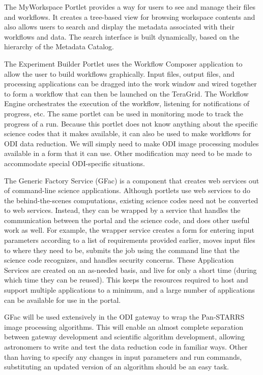 \documentclass[10pt,conference]{IEEEtran}
\begin{document}
The MyWorkspace Portlet provides a way for users to see and manage their files and workflows. It creates a tree-based view for browsing workspace contents and also allows users to search and display the metadata associated with their workflows and data. The search interface is built dynamically, based on the hierarchy of the Metadata Catalog. 

The Experiment Builder Portlet uses the Workflow Composer application to allow the user to build workflows graphically. Input files, output files, and processing applications can be dragged into the work window and wired together to form a workflow that can then be launched on the TeraGrid. The Workflow Engine orchestrates the execution of the workflow, listening for notifications of progress, etc. The same portlet can be used in monitoring mode to track the progress of a run. Because this portlet does not know anything about the specific science codes that it makes available, it can also be used to make workflows for ODI data reduction. We will simply need to make  ODI image processing modules available in a form that it can use. Other modification may need to be made to accommodate special ODI-specific situations.
 
The Generic Factory Service (GFac) is a component that creates web services out of command-line science applications. Although portlets use web services to do the behind-the-scenes computations, existing science codes need not be converted to web services. Instead, they can be wrapped by a service that handles the communication between the portal and the science code, and does other useful work as well. For example, the wrapper service creates a form for entering input parameters according to a list of requirements provided earlier, moves input files to where they need to be, submits the job using the command line that the science code recognizes, and handles security concerns. These Application Services are created on an as-needed basis, and live for only a short time (during which time they can be reused). This keeps the resources required to host and support multiple applications to a minimum, and a large number of applications can be available for use in the portal. 

GFac will be used extensively in the ODI gateway to wrap the Pan-STARRS image processing algorithms. This will enable an almost complete separation between gateway development and scientific algorithm development, allowing astronomers to write and test the data reduction code in familiar ways. Other than having to specify any changes in input parameters and run commands, substituting an updated version of an algorithm should be an easy task.
\end{document}
